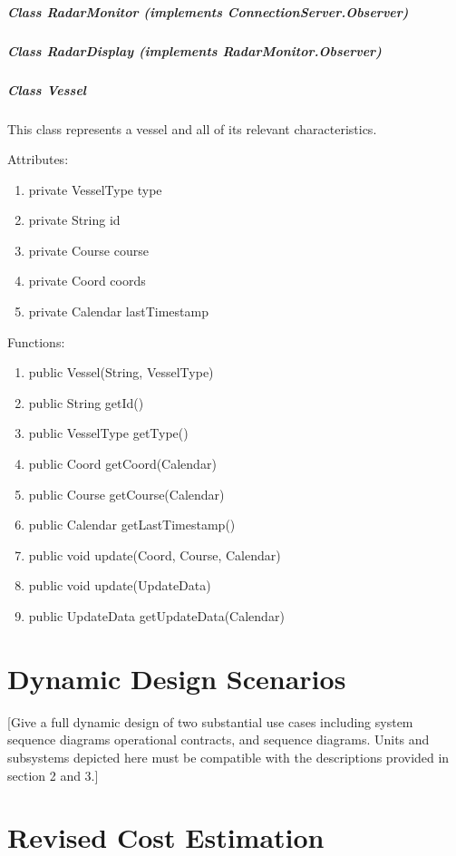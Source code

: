\documentclass{article}
\begin{document}
\subparagraph{Class RadarMonitor (implements ConnectionServer.Observer)} %

\subparagraph{Class RadarDisplay (implements RadarMonitor.Observer)} %

\subparagraph{Class Vessel}
This class represents a vessel and all of its relevant characteristics.

\vspace{0.5cm}

Attributes:
\begin{enumerate}
	\item private VesselType type
    \item private String id
    \item private Course course
    \item private Coord coords
    \item private Calendar lastTimestamp
\end {enumerate}

\vspace{0.5cm}

Functions:
\begin{enumerate}
	\item public Vessel(String, VesselType)
	\item public String getId()
	\item public VesselType getType()
	\item public Coord getCoord(Calendar)
	\item public Course getCourse(Calendar)
	\item public Calendar getLastTimestamp()
	\item public void update(Coord, Course, Calendar)
	\item public void update(UpdateData)
	\item public UpdateData getUpdateData(Calendar)
\end{enumerate}


\section{Dynamic Design Scenarios} %

[Give a full dynamic design of two substantial use cases including system sequence diagrams operational contracts, and sequence diagrams. Units and subsystems depicted here must be compatible with the descriptions provided in section 2 and 3.]

\section{Revised Cost Estimation} %
\end{document}
